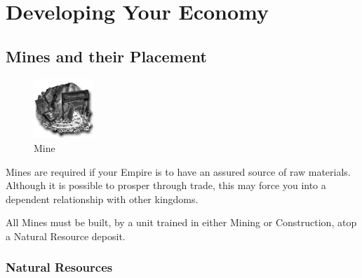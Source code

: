 
\chapter{Developing Your Economy}

\section{Mines and their Placement}

\begin{figure}
	\vspace{-20pt}
	\begin{center}
		\includegraphics[width=0.2\textwidth]{Imine}
		\\ Mine
	\end{center}
	\vspace{-20pt}
\end{figure}

Mines are required if your Empire is to have an assured source of raw materials. Although it is possible to prosper through trade, this may force you into a dependent relationship with other kingdoms.

All Mines must be built, by a unit trained in either Mining or Construction, atop a Natural Resource deposit. \\

\subsection{Natural Resources}

